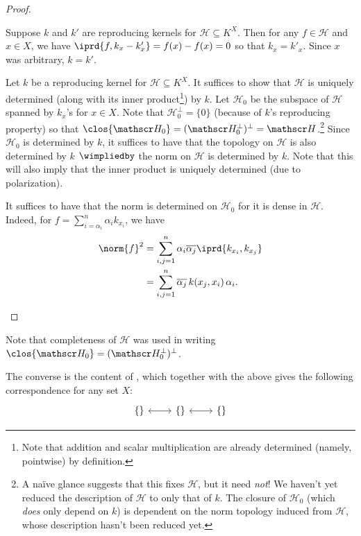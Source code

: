 	\begin{proof}
		\begin{mylist}
			\item Suppose $k$ and $k'$ are reproducing kernels for $\mathscr H\subseteq K^X$. Then for any $f\in \mathscr H$ and $x\in X$, we have $\iprd{f, k_x - k'_x} = f(x) - f(x) = 0$ so that $k_x = k'_x$. Since $x$ was arbitrary, $k = k'$.
			
			\item Let $k$ be a reproducing kernel for $\mathscr H\subseteq K^X$. It suffices to show that $\mathscr H$ is uniquely determined (along with its inner product\footnote{
				Note that addition and scalar multiplication are already determined (namely, pointwise) by definition.
			}) by $k$. Let $\mathscr H_0$ be the subspace of $\mathscr H$ spanned by $k_x$'s for $x\in X$. Note that $\mathscr H_0^\perp = \{0\}$ (because of $k$'s reproducing property) so that $\clos{\mathscr H_0} = (\mathscr H_0^\perp)^\perp = \mathscr H$.\footnote{
				A naïve glance suggests that this fixes $\mathscr H$, but it need \emph{not}! We haven't yet reduced the description of $\mathscr H$ to only that of $k$. The closure of $\mathscr H_0$ (which \emph{does} only depend on $k$) is dependent on the norm topology induced from $\mathscr H$, whose description hasn't been reduced yet.
			} Since $\mathscr H_0$ is determined by $k$, it suffices to have that the topology on $\mathscr H$ is also determined by $k$ $\wimpliedby$ the norm on $\mathscr H$ is determined by $k$. Note that this will also imply that the inner product is uniquely determined (due to polarization).
			
			It suffices to have that the norm is determined on $\mathscr H_0$ for it is dense in $\mathscr H$. Indeed, for $f = \sum_{i = \alpha_i}^n \alpha_i k_{x_i}$, we have
			\begin{align*}
				\norm{f}^2
				& = \sum_{i, j = 1}^n \alpha_i \overline{\alpha_j} \iprd{k_{x_i}, k_{x_j}}\\
				& = \sum_{i, j = 1}^n \overline{\alpha_j}\, k(x_j, x_i)\, \alpha_i\text.\tag*{\qedhere}
			\end{align*}
		\end{mylist}
	\end{proof}
	
	\begin{rmk}
		\begin{mylist}
			\item Note that completeness of $\mathscr H$ was used in writing $\clos{\mathscr H_0} = (\mathscr H_0^\perp)^\perp$.
			
			\item The converse is the content of , which together with the above gives the following correspondence for any set $X$:
			\[
			\begin{tikzcd}
				\{\}\ar[r, leftrightarrow] & \{\}\ar[r, leftrightarrow] & \{\}
			\end{tikzcd}
			\]
		\end{mylist}
	\end{rmk}
	
